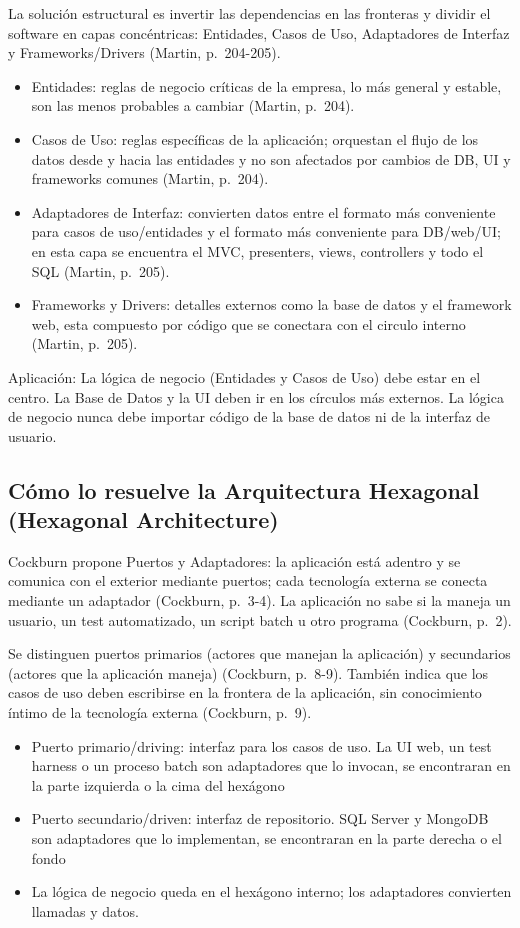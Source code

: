 \documentclass[12pt,a4paper]{article}
\begin{document}
La solución estructural es invertir las dependencias en las fronteras y dividir el software en capas concéntricas: Entidades, Casos de Uso, Adaptadores de Interfaz y Frameworks/Drivers (Martin, p.~204-205).

\begin{itemize}[label=$\cdot$]
  \item Entidades: reglas de negocio críticas de la empresa, lo más general y estable, son las menos probables a cambiar (Martin, p.~204).
  \item Casos de Uso: reglas específicas de la aplicación; orquestan el flujo de los datos desde y hacia las entidades y no son afectados por cambios de DB, UI y frameworks comunes (Martin, p.~204).
  \item Adaptadores de Interfaz: convierten datos entre el formato más conveniente para casos de uso/entidades y el formato más conveniente para DB/web/UI; en esta capa se encuentra el MVC, presenters, views, controllers y todo el SQL (Martin, p.~205).
  \item Frameworks y Drivers: detalles externos como la base de datos y el framework web, esta compuesto por código que se conectara con el circulo interno (Martin, p.~205).
\end{itemize}

Aplicación: La lógica de negocio (Entidades y Casos de Uso) debe estar en el centro. La Base de Datos y la UI deben ir en los círculos más externos. La lógica de negocio nunca debe importar código de la base de datos ni de la interfaz de usuario.

\subsection{Cómo lo resuelve la Arquitectura Hexagonal (Hexagonal Architecture)}

Cockburn propone Puertos y Adaptadores: la aplicación está adentro y se comunica con el exterior mediante puertos; cada tecnología externa se conecta mediante un adaptador (Cockburn, p.~3-4). La aplicación no sabe si la maneja un usuario, un test automatizado, un script batch u otro programa (Cockburn, p.~2).

Se distinguen puertos primarios (actores que manejan la aplicación) y secundarios (actores que la aplicación maneja) (Cockburn, p.~8-9). También indica que los casos de uso deben escribirse en la frontera de la aplicación, sin conocimiento íntimo de la tecnología externa (Cockburn, p.~9).

\begin{itemize}[label=$\cdot$]
  \item Puerto primario/driving: interfaz para los casos de uso. La UI web, un test harness o un proceso batch son adaptadores que lo invocan, se encontraran en la parte izquierda o la cima del hexágono
  \item Puerto secundario/driven: interfaz de repositorio. SQL Server y MongoDB son adaptadores que lo implementan, se encontraran en la parte derecha o el fondo
  \item La lógica de negocio queda en el hexágono interno; los adaptadores convierten llamadas y datos.
\end{itemize}
\end{document}
